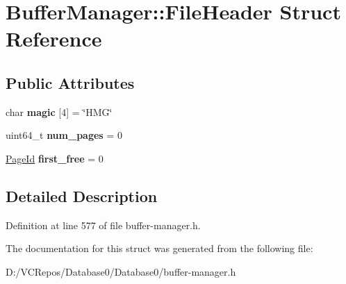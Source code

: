 \hypertarget{struct_buffer_manager_1_1_file_header}{}\section{Buffer\+Manager\+::File\+Header Struct Reference}
\label{struct_buffer_manager_1_1_file_header}
\subsection*{Public Attributes}
\begin{DoxyCompactItemize}
\item 
\mbox{\label{struct_buffer_manager_1_1_file_header_ae0fc2117f18e9046b88043eb638787eb}} 
char {\bfseries magic} \mbox{[}4\mbox{]} = \char`\"{}H\+MG\char`\"{}
\item 
\mbox{\label{struct_buffer_manager_1_1_file_header_adc8b933ab21ae98c6cdb553b6fa362c2}} 
uint64\+\_\+t {\bfseries num\+\_\+pages} = 0
\item 
\mbox{\label{struct_buffer_manager_1_1_file_header_a604b2527912468d123207f96428017af}} 
\mbox{\hyperlink{struct_generic_i_o_id}{Page\+Id}} {\bfseries first\+\_\+free} = 0
\end{DoxyCompactItemize}


\subsection{Detailed Description}


Definition at line 577 of file buffer-\/manager.\+h.



The documentation for this struct was generated from the following file\+:\begin{DoxyCompactItemize}
\item 
D\+:/\+V\+C\+Repos/\+Database0/\+Database0/buffer-\/manager.\+h\end{DoxyCompactItemize}
